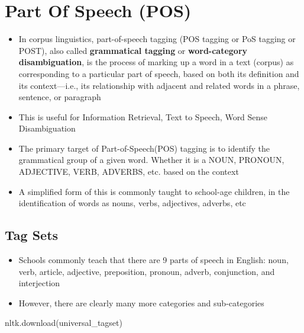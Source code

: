 \documentclass[
]{book}
\newenvironment{Shaded}{\begin{snugshade}}{\end{snugshade}}
\newcommand{\NormalTok}[1]{#1}
\newcommand{\StringTok}[1]{\textcolor[rgb]{0.5,0.5,0.5}{#1}}
\providecommand{\tightlist}{%
  \setlength{\itemsep}{0pt}\setlength{\parskip}{0pt}}
\begin{document}
\hypertarget{part-of-speech-pos}{%
\section{Part Of Speech (POS)}\label{part-of-speech-pos}}

\begin{itemize}
\tightlist
\item
  In corpus linguistics, part-of-speech tagging (POS tagging or PoS tagging or POST), also called \textbf{grammatical tagging} or \textbf{word-category disambiguation}, is the process of marking up a word in a text (corpus) as corresponding to a particular part of speech, based on both its definition and its context---i.e., its relationship with adjacent and related words in a phrase, sentence, or paragraph\\
\item
  This is useful for Information Retrieval, Text to Speech, Word Sense Disambiguation\\
\item
  The primary target of Part-of-Speech(POS) tagging is to identify the grammatical group of a given word. Whether it is a NOUN, PRONOUN, ADJECTIVE, VERB, ADVERBS, etc. based on the context\\
\item
  A simplified form of this is commonly taught to school-age children, in the identification of words as nouns, verbs, adjectives, adverbs, etc
\end{itemize}

\hypertarget{tag-sets}{%
\subsection{Tag Sets}\label{tag-sets}}

\begin{itemize}
\tightlist
\item
  Schools commonly teach that there are 9 parts of speech in English: noun, verb, article, adjective, preposition, pronoun, adverb, conjunction, and interjection\\
\item
  However, there are clearly many more categories and sub-categories
\end{itemize}

\begin{Shaded}
\begin{Highlighting}[]
\NormalTok{ nltk.download(}\StringTok{\textquotesingle{}universal\_tagset\textquotesingle{}}\NormalTok{)}
\end{Highlighting}
\end{Shaded}
\end{document}
